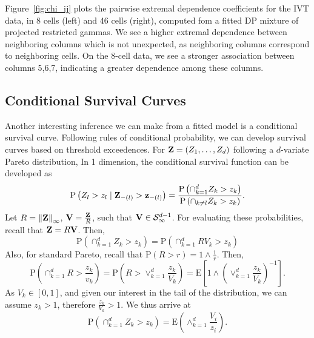 Figure~\ref{fig:chi_ij} plots the pairwise extremal dependence coefficients for the IVT data, in 8
  cells (left) and 46 cells (right), computed fom a fitted DP mixture of projected restricted gammas.
  We see a higher extremal dependence between neighboring columns which is not unexpected, as
  neighboring columns correspond to neighboring cells.  On the 8-cell data, we see a stronger
  association between columns 5,6,7, indicating a greater dependence among these columns.



\subsection{Conditional Survival Curves}
Another interesting inference we can make from a fitted model is a conditional survival curve.
  Following rules of conditional probability, we can develop survival curves based on
  threshold exceedences. For ${\bf Z} = (Z_1,\ldots,Z_d)$ following a $d$-variate Pareto distribution,
  In 1 dimension, the conditional survival function can be developed as
  \begin{equation}
    \label{eqn:condsurv1d}
    \text{P}\left(Z_l > z_l\mid {\bf Z}_{-(l)} > {\bf z}_{-(l)}\right) =
      \frac{\text{P}\left(\cap_{k = 1}^d Z_k > z_k\right)}{\text{P}\left(\cap_{k \neq l} Z_k > z_k\right)}.
  \end{equation}
  Let $R = \left\lVert {\bf Z} \right\rVert_{\infty}$, ${\bf V} = \frac{{\bf Z}}{R}$, such that ${\bf V}\in \mathcal{S}_{\infty}^{d-1}$.
  For evaluating these probabilities, recall that ${\bf Z} = R{\bf V}$.  Then,
  \begin{equation}
    \text{P}\left(\cap_{k = 1}^d Z_k > z_k\right) = \text{P}\left(\cap_{k = 1}^d RV_k > z_k\right)
  \end{equation}
  Also, for standard Pareto, recall that $\text{P}(R > r) = 1\wedge\frac{1}{r}$.  Then,
  \begin{equation}
    \text{P}\left(\cap_{k = 1}^d R > \frac{z_k}{v_k}\right) =
      \text{P}\left(R  > \vee_{k=1}^d\frac{z_k}{V_k}\right) =
      \text{E}\left[1 \wedge \left(\vee_{k = 1}^d\frac{z_k}{V_k}\right)^{-1}\right].
  \end{equation}
  As $V_k \in [0,1]$, and given our interest in the tail of the distribution, we can assume $z_k > 1$,
  therefore $\frac{z_k}{V_k} > 1$.  We thus arrive at
  \begin{equation}
    \text{P}\left(\cap_{k = 1}^dZ_k > z_k\right) = \text{E}\left(\wedge_{k = 1}^d\frac{V_i}{z_i}\right).
  \end{equation}
